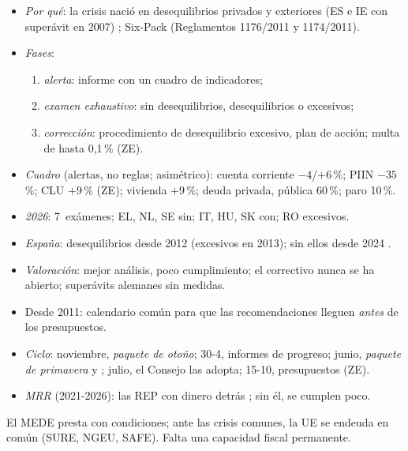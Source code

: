 \documentclass{article}
\begin{document}
\begin{columnas}
\begin{itemize}
\item \emph{Por qué}: la crisis nació en desequilibrios privados y exteriores (ES e IE con superávit en 2007) ; Six-Pack (Reglamentos 1176/2011 y 1174/2011).
\item \emph{Fases}:
  \begin{enumerate}
  \item \emph{alerta}: informe con un cuadro de indicadores;
  \item \emph{examen exhaustivo}: sin desequilibrios, desequilibrios o excesivos;
  \item \emph{corrección}: procedimiento de desequilibrio excesivo, plan de acción; multa de hasta 0,1\,\% (ZE).
  \end{enumerate}
\item \emph{Cuadro} (alertas, no reglas; asimétrico): cuenta corriente $-4$/$+6$\,\%; PIIN $-35$\,\%; CLU $+9$\,\% (ZE); vivienda $+9$\,\%; deuda privada, pública 60\,\%; paro 10\,\%.
\item \emph{2026}: 7~exámenes; EL, NL, SE sin; IT, HU, SK con; RO excesivos.
\item \emph{España}: desequilibrios desde 2012 (excesivos en 2013); sin ellos desde 2024 .
\item \emph{Valoración}: mejor análisis, poco cumplimiento; el correctivo nunca se ha abierto; superávits alemanes sin medidas.
\end{itemize}

\begin{itemize}
\item Desde 2011: calendario común para que las recomendaciones lleguen \emph{antes} de los presupuestos.
\item \emph{Ciclo}: noviembre, \emph{paquete de otoño}; 30-4, informes de progreso; junio, \emph{paquete de primavera} y ; julio, el Consejo las adopta; 15-10, presupuestos (ZE).
\item \emph{MRR} (2021-2026): las REP con dinero detrás ; sin él, se cumplen poco.
\end{itemize}

\begin{ideaclave}
El MEDE presta con condiciones; ante las crisis comunes, la UE se endeuda en común (SURE, NGEU, SAFE). Falta una capacidad fiscal permanente.
\end{ideaclave}


\end{columnas}
\end{document}
